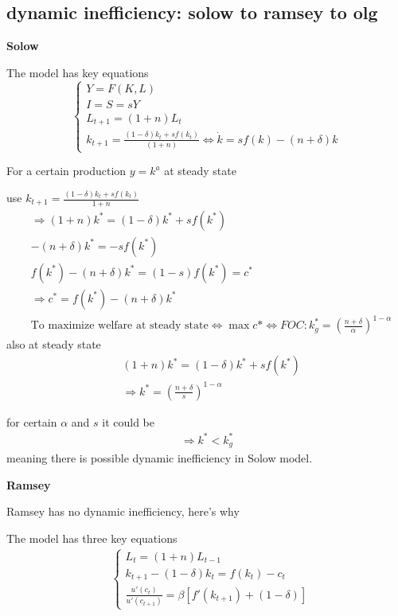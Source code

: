 \documentclass{article}
\begin{document}
\subsection{dynamic inefficiency: solow to ramsey to olg}
\textbf{Solow}

The model has key equations
\begin{equation}
\begin{cases}
  Y=F(K,L)
  \\
  I=S=sY
  \\
  L_{t+1}=(1+n)L_t
  \\
  k_{t+1}=\frac{(1-\delta)k_t+sf(k_t)}{(1+n)}\iff \dot k=sf(k)-(n+\delta)k
\end{cases}
\end{equation}

For a certain production $y=k^a$ at steady state

use $k_{t+1}=\frac{(1-\delta)k_{t}+s f(k_{t})}{1+n}$
\begin{align}
&\Rightarrow(1+n)k^*=(1-\delta)k^*+s f(k^*)
\\&-(n+\delta)k^*=-s f(k^*)
\\&f(k^*)-(n+\delta)k^*=(1-s) f(k^*)=c^*
\\&\Rightarrow c^*=f(k^*)-(n+\delta)k^*
\\&\text{To maximize welfare at steady state} \iff \max c* \iff FOC: k^*_g=(\frac{n+\delta}{\alpha})^{1-\alpha}
\end{align}
also at steady state
\begin{align}
&(1+n)k^*=(1-\delta)k^*+s f(k^*) 
\\&\Rightarrow k^*=(\frac{n+\delta}{s})^{1-\alpha}
\end{align}

for certain $\alpha$ and $s$ it could be
\begin{align}
\Rightarrow k^*<k^*_{g}
\end{align}
meaning there is possible dynamic inefficiency in Solow model.

\textbf{Ramsey}

Ramsey has no dynamic inefficiency, here's why

The model has three key equations
\begin{align}
&\begin{cases}L_{t}=(1+n)L_{t-1} \\
k_{t+1}-(1-\delta)k_t=f(k_t)-c_t \\
\frac{u'(c_{t})}{u'(c_{t+1})}=\beta[f'(k_{t+1})+(1-\delta)]
\end{cases}
\end{align}
\end{document}
